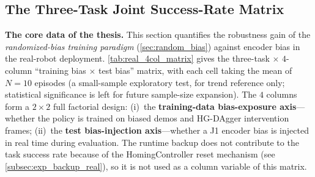 \subsection{The Three-Task Joint Success-Rate Matrix}\label{subsec:exp_4col_matrix}

\textbf{The core data of the thesis.} This section quantifies the robustness gain of the \emph{randomized-bias training paradigm} (\cref{sec:random_bias}) against encoder bias in the real-robot deployment. \cref{tab:real_4col_matrix} gives the three-task $\times$ $4$-column ``training bias $\times$ test bias'' matrix, with each cell taking the mean of $N=10$ episodes (a small-sample exploratory test, for trend reference only; statistical significance is left for future sample-size expansion). The $4$ columns form a $2 \times 2$ full factorial design: (i)~the \textbf{training-data bias-exposure axis}---whether the policy is trained on biased demos and HG-DAgger intervention frames; (ii)~the \textbf{test bias-injection axis}---whether a J1 encoder bias is injected in real time during evaluation. The runtime backup does not contribute to the task success rate because of the HomingController reset mechanism (see \cref{subsec:exp_backup_real}), so it is not used as a column variable of this matrix.

